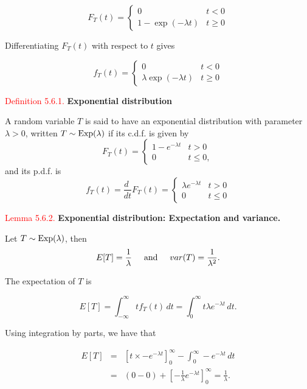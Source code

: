 \documentclass[
]{book}
\begin{document}
\[ F_T (t) = \left\{ \begin{array}{ll} 0 & t < 0 \\ 1 - \exp(-\lambda
t) & t \geq 0 \end{array} \right. \]

Differentiating \(F_T (t)\) with respect to \(t\) gives

\[ f_T (t) = \left\{ \begin{array}{ll} 0 & t < 0 \\ \lambda \exp(- \lambda t) & t \geq 0 \end{array} \right. \]

\leavevmode{}%
\textcolor{red}{Definition 5.6.1.}
{\textbf{Exponential distribution}}

A random variable \(T\) is said to have an exponential distribution
with parameter \(\lambda > 0\), written \(T \sim {\rm Exp} (\lambda)\) if its
c.d.f. is given by
\[ F_T (t) = \left\{ \begin{array}{ll} 1- e^{- \lambda t} & t>0 \\
0 & t \leq 0, \end{array} \right. \]
and its p.d.f. is
\[ f_T (t) = \frac{d \;}{dt} F_T (t) = \left\{ \begin{array}{ll} \lambda
e^{- \lambda t} & t>0 \\
0 & t \leq 0 \end{array} \right. \]

\leavevmode{}%
\textcolor{red}{Lemma 5.6.2.}
{\textbf{Exponential distribution: Expectation and variance.}}

Let \(T \sim {\rm Exp} (\lambda)\), then
\[ E[T]= \frac{1}{\lambda} \hspace{0.5cm} \mbox{and} \hspace{0.5cm} var(T) = \frac{1}{\lambda^2}. \]

The expectation of \(T\) is

\[ E[T] = \int_{-\infty}^\infty t f_T (t) \, dt = \int_0^\infty t
\lambda e^{- \lambda t} \, dt. \]

Using integration by parts, we have that

\begin{eqnarray*} E[T] &=& \left[ t \times - e^{-\lambda t} \right]_0^\infty -
\int_0^\infty - e^{-\lambda t} \, dt \\
&=& (0-0) + \left[ - \frac{1}{\lambda} e^{-\lambda t}
\right]_0^\infty  = \frac{1}{\lambda}.\end{eqnarray*}
\end{document}
